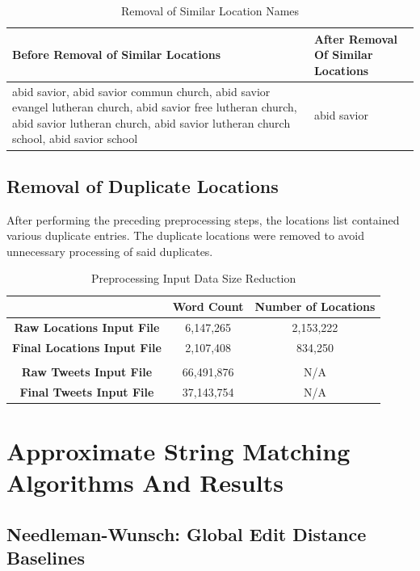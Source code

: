 \documentclass[11pt,a4paper]{article}
\begin{document}
\begin{table}[h]
\caption{Removal of Similar Location Names}	
\centering
	\begin{tabular}{| p{7cm} | p{7cm} | }
	\hline
	\textbf{Before Removal of Similar Locations} & \textbf{After Removal Of Similar Locations}\\
	\hline
	abid savior, abid savior commun church, abid savior evangel lutheran church, abid savior free lutheran church, abid savior lutheran church, abid savior lutheran church school, abid savior school & abid savior
	\\
	\hline
	\end{tabular}
\label{table:similar-locals}

\end{table}

\subsection{Removal of Duplicate Locations}       
After performing the preceding preprocessing steps, the locations list contained various duplicate entries. The duplicate locations were removed to avoid unnecessary processing of said duplicates.

\begin{table} [th]
\caption{Preprocessing Input Data Size Reduction}
\centering
	\begin{tabular}{| c | c | c |}
	\hline
	 &  \textbf{Word Count} & \textbf{Number of Locations}\\
	\hline
	\textbf{Raw Locations Input File} & 6,147,265 & 2,153,222\\
	\hline
	\textbf{Final Locations Input File} & 2,107,408 & 834,250\\
	\hline
	 &  & \\
	\hline
	\textbf{Raw Tweets Input File} & 66,491,876 & N/A\\
	\hline
	\textbf{Final Tweets Input File} & 37,143,754 & N/A\\
	\hline
	\end{tabular}
\label{table:input-table}
\end{table}

\section{Approximate String Matching Algorithms And Results}

\subsection{Needleman-Wunsch: Global Edit Distance Baselines}
\end{document}
